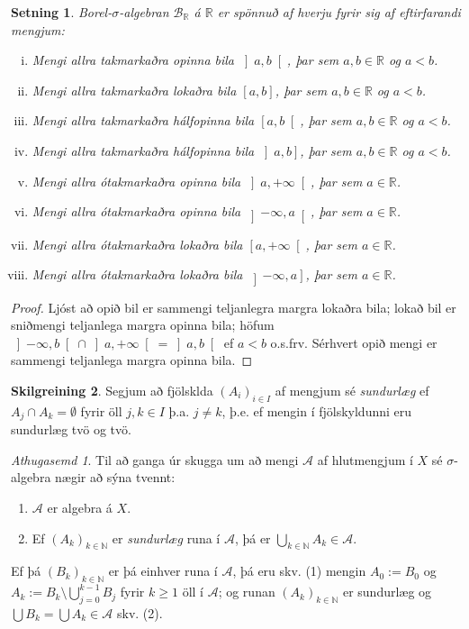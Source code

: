 \documentclass[a4paper,icelandic,11pt]{book}
\theoremstyle{plain}      \newtheorem{setn}{Setning}[chapter]
\theoremstyle{definition} \newtheorem{skilgr}[setn]{Skilgreining}
\theoremstyle{remark}     \newtheorem*{ath}{Athugasemd}
\newcommand{\R}{\mathbb R}
\newcommand{\N}{\mathbb N}
\begin{document}
\begin{setn}
  Borel-$\sigma$-algebran $\mathcal B_{\R}$ á $\R$ er spönnuð af
  hverju fyrir sig af eftirfarandi mengjum:
  \begin{enumerate}[(i)]
  \item Mengi allra takmarkaðra opinna bila $\left]a,b\right[$, þar
    sem $a,b\in\R$ og $a<b$.
  \item Mengi allra takmarkaðra lokaðra bila $\left[a,b\right]$, þar
    sem $a,b\in\R$ og $a<b$.
  \item Mengi allra takmarkaðra hálfopinna bila $\left[a,b\right[$,
    þar sem $a,b\in\R$ og $a<b$.
  \item Mengi allra takmarkaðra hálfopinna bila $\left]a,b\right]$,
    þar sem $a,b\in\R$ og $a<b$.
  \item Mengi allra ótakmarkaðra opinna bila $\left]a,+\infty\right[$,
    þar sem $a\in\R$.
  \item Mengi allra ótakmarkaðra opinna bila $\left]-\infty,a\right[$,
    þar sem $a\in\R$.
  \item Mengi allra ótakmarkaðra lokaðra bila
    $\left[a,+\infty\right[$, þar sem $a\in\R$.
  \item Mengi allra ótakmarkaðra lokaðra bila
    $\left]-\infty,a\right]$, þar sem $a\in\R$.
  \end{enumerate}
\end{setn}
\begin{proof}
  Ljóst að opið bil er sammengi teljanlegra margra lokaðra bila; lokað
  bil er sniðmengi teljanlega margra opinna bila; höfum
  $\left]-\infty,b\right[\cap\left]a,+\infty\right[=\left]a,b\right[$
  ef $a<b$ o.s.frv. Sérhvert opið mengi er sammengi teljanlega margra
  opinna bila.
\end{proof}
\begin{skilgr}
  Segjum að fjölsklda $(A_{i})_{i\in I}$ af mengjum sé
  \emph{sundurlæg} ef
  $A_{j}\cap{A_{k}}=\emptyset$ fyrir öll $j,k\in I$ þ.a. $j\ne k$,
  þ.e. ef mengin í fjölskyldunni eru sundurlæg tvö og tvö.
\end{skilgr}
\begin{ath}
  Til að ganga úr skugga um að mengi $\mathcal A$ af hlutmengjum í $X$
  sé $\sigma$-algebra nægir að sýna tvennt:
  \begin{enumerate}[(1)]
  \item $\mathcal A$ er algebra á $X$.
  \item Ef $(A_{k})_{k\in\N}$ er \emph{sundurlæg} runa í $\mathcal A$,
    þá er $\bigcup_{k\in\N}A_{k}\in\mathcal A$.
  \end{enumerate}
  Ef þá $(B_{k})_{k\in\N}$ er þá einhver runa í $\mathcal A$, þá eru
  skv. (1) mengin $A_{0}:=B_{0}$ og
  $A_{k}:=B_{k}\setminus\bigcup_{j=0}^{k-1}B_{j}$ fyrir $k\ge 1$ öll í
  $\mathcal A$; og runan $(A_{k})_{k\in\N}$ er sundurlæg og
  $\bigcup{B_{k}}=\bigcup{A_{k}}\in\mathcal A$ skv. (2).
\end{ath}
\end{document}
